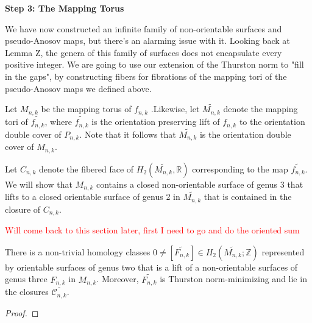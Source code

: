 \begin{center}
\textbf{Step 3: The Mapping Torus}
\end{center}

We have now constructed an infinite family of non-orientable surfaces and pseudo-Anosov maps, but there's an alarming issue with it. Looking back at Lemma Z, the genera of this family of surfaces does not encapsulate every positive integer. We are going to use our extension of the Thurston norm to "fill in the gaps", by constructing fibers for fibrations of the mapping tori of the pseudo-Anosov maps we defined above.

Let $M_{n,k}$ be the mapping torus of $f_{n,k}$ .Likewise, let $\widetilde{M_{n,k}}$ denote the mapping tori of $\widetilde{f_{n,k}}$, where $\widetilde{f_{n,k}}$ is the orientation preserving lift of $f_{n,k}$ to the orientation double cover of $P_{n,k}$. Note that it follows that $\widetilde{M_{n,k}}$ is the orientation double cover of $M_{n,k}$.

Let $C_{n,k}$ denote the fibered face of $H_2(\widetilde{M_{n,k}},\mathbb{R})$ corresponding to the map $\widetilde{f_{n,k}}$. We will show that $M_{n,k}$ contains a closed non-orientable surface of genus 3 that lifts to a closed orientable surface of genus 2 in $\widetilde{M_{n,k}}$ that is contained in the closure of $C_{n,k}$.

\textcolor{red}{Will come back to this section later, first I need to go and do the oriented sum}

\begin{lem}
There is a non-trivial homology classes $0 \neq [\widetilde{F_{n,k}}] \in H_2(\widetilde{M_{n,k}};\mathbb{Z})$ represented by orientable surfaces of genus two that is a lift of a non-orientable surfaces of genus three $F_{n,k}$ in $M_{n,k}$. Moreover, $\widetilde{F_{n,k}}$ is Thurston norm-minimizing and lie in the closures $\overline{\mathcal{C}_{n,k}}$.
\end{lem}
\begin{proof}

\end{proof}


